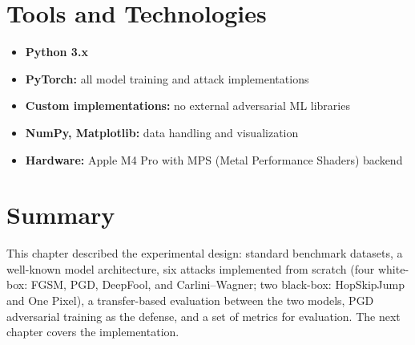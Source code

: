 \section{Tools and Technologies}

\begin{itemize}
    \item \textbf{Python 3.x}
    \item \textbf{PyTorch:} all model training and attack implementations
    \item \textbf{Custom implementations:} no external adversarial ML libraries
    \item \textbf{NumPy, Matplotlib:} data handling and visualization
    \item \textbf{Hardware:} Apple M4 Pro with MPS (Metal Performance Shaders) backend
\end{itemize}

\section{Summary}

This chapter described the experimental design: standard benchmark datasets, a well-known model architecture, six attacks implemented from scratch (four white-box: FGSM, PGD, DeepFool, and Carlini--Wagner; two black-box: HopSkipJump and One Pixel), a transfer-based evaluation between the two models, PGD adversarial training as the defense, and a set of metrics for evaluation. The next chapter covers the implementation.

